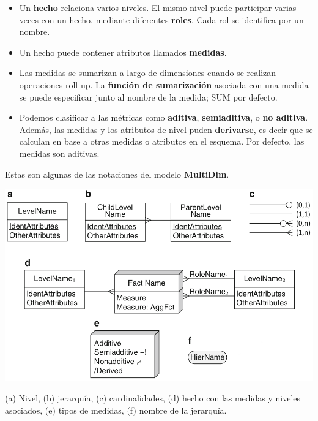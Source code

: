 \documentclass{fancyslides}
\begin{document}
\begin{frame}
\misc
{
\begin{itemize}
  \item \justifying Un \textbf{hecho} relaciona varios niveles. El mismo nivel puede participar varias veces con un hecho, mediante diferentes \textbf{roles}.  Cada rol se identifica por un nombre.
  \item \justifying Un hecho puede contener atributos llamados \textbf{medidas}.
  \item \justifying Las medidas se sumarizan a largo de dimensiones cuando se realizan operaciones roll-up. La \textbf{función de sumarización} asociada con una medida se puede especificar junto al nombre de la medida; SUM por defecto.
  \item \justifying Podemos clasificar a las métricas como \textbf{aditiva}, \textbf{semiaditiva}, o \textbf{no aditiva}. Además, las medidas y los atributos de nivel puden \textbf{derivarse}, es decir que se calculan en base a otras medidas o atributos en el esquema. Por defecto, las medidas son aditivas.
\end{itemize}
}
\end{frame}

\begin{frame}
\misc
{
Estas son algunas de las notaciones del modelo \textbf{MultiDim}.

\begin{center}
\includegraphics[scale=0.22]{diseno2}

{\footnotesize (a) Nivel, (b) jerarquía, (c) cardinalidades, (d) hecho con las medidas y niveles asociados, (e) tipos de medidas, (f) nombre de la jerarquía.}
\end{center}
}
\end{frame}
\end{document}
